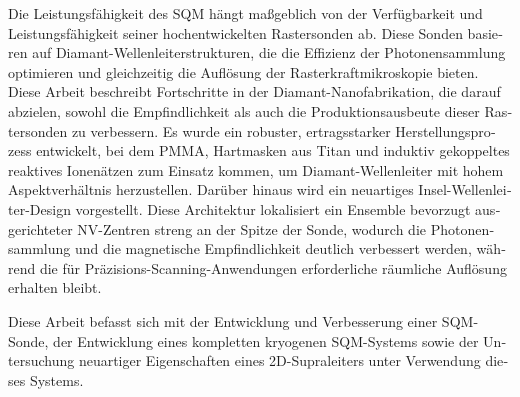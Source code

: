 \begin{otherlanguage}{ngerman}
Die Leistungsfähigkeit des SQM hängt maßgeblich von der Verfügbarkeit und Leistungsfähigkeit seiner hochentwickelten Rastersonden ab. Diese Sonden basieren auf Diamant-Wellenleiterstrukturen, die die Effizienz der Photonensammlung optimieren und gleichzeitig die Auflösung der Rasterkraftmikroskopie bieten. Diese Arbeit beschreibt Fortschritte in der Diamant-Nanofabrikation, die darauf abzielen, sowohl die Empfindlichkeit als auch die Produktionsausbeute dieser Rastersonden zu verbessern. Es wurde ein robuster, ertragsstarker Herstellungsprozess entwickelt, bei dem PMMA, Hartmasken aus Titan und induktiv gekoppeltes reaktives Ionenätzen zum Einsatz kommen, um Diamant-Wellenleiter mit hohem Aspektverhältnis herzustellen. Darüber hinaus wird ein neuartiges Insel-Wellenleiter-Design vorgestellt. Diese Architektur lokalisiert ein Ensemble bevorzugt ausgerichteter NV-Zentren streng an der Spitze der Sonde, wodurch die Photonensammlung und die magnetische Empfindlichkeit deutlich verbessert werden, während die für Präzisions-Scanning-Anwendungen erforderliche räumliche Auflösung erhalten bleibt.

Diese Arbeit befasst sich mit der Entwicklung und Verbesserung einer SQM-Sonde, der Entwicklung eines kompletten kryogenen SQM-Systems sowie der Untersuchung neuartiger Eigenschaften eines 2D-Supraleiters unter Verwendung dieses Systems.
\end{otherlanguage}